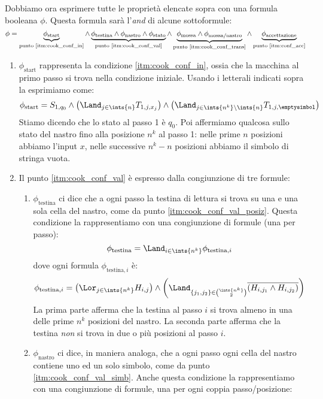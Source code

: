 Dobbiamo ora esprimere tutte le propriet\`a elencate sopra con una formula booleana $\phi$.
Questa formula sar\`a l'\emph{and} di alcune sottoformule:
\[
	\phi = 
	\underbrace{\phi_{\text{start}}}_{\text{punto \ref{itm:cook_conf_in}}} \land 
	\underbrace{\phi_{\text{testina}} \land \phi_{\text{nastro}} \land \phi_{\text{stato}}}_{\text{punto \ref{itm:cook_conf_val}}} \land 
	\underbrace{\phi_{\text{mossa}} \land \phi_{\text{mossa/nastro}}}_{\text{punto \ref{itm:cook_conf_trans}}} \land 
	\underbrace{\phi_{\text{accettazione}}}_{\text{punto \ref{itm:conf_acc}}}
\]
\begin{enumerate}
	\item $\phi_{\text{start}}$ rappresenta la condizione \ref{itm:cook_conf_in}, ossia che la macchina al primo passo si trova nella condizione iniziale.
	Usando i letterali indicati sopra la esprimiamo come:
	\[
		\phi_{\text{start}} = 
		S_{1,q_0} \land \left( \Land_{j \in \ints{n}} T_{1,j,x_j} \right) \land \left( \Land_{j \in \ints{n^k} \setminus \ints{n}} T_{1,j,\emptysimbol} \right)
	\]
	Stiamo dicendo che lo stato al passo 1 \`e $q_0$.
	Poi affermiamo qualcosa sullo stato del nastro fino alla posizione $n^k$ al passo 1: nelle prime $n$ posizioni abbiamo l'input $x$, nelle successive $n^k - n$ posizioni abbiamo il simbolo di stringa vuota.
	\item Il punto \ref{itm:cook_conf_val} \`e espresso dalla congiunzione di tre formule:
		\begin{enumerate}
			\item $\phi_{\text{testina}}$ ci dice che a ogni passo la testina di lettura si trova su una e una sola cella del nastro, come da punto \ref{itm:cook_conf_val_posiz}.
			Questa condizione la rappresentiamo con una congiunzione di formule (una per passo):
			\[
				\phi_{\text{testina}} = \Land_{i \in \ints{n^k}} \phi_{\text{testina},i}
			\]
			dove ogni formula $\phi_{\text{testina},i}$ \`e:
			\[
				\phi_{\text{testina},i} = \left( \Lor_{j \in \ints{n^k}} H_{i,j} \right) \land
				\left( \Land_{\{j_1,j_2\} \in \binom{\ints{n^k}}{2}} \overline{\left( H_{i,j_1} \land H_{i,j_2} \right)} \right)
			\]
			La prima parte afferma che la testina al passo $i$ si trova almeno in una delle prime $n^k$ posizioni del nastro.
			La seconda parte afferma che la testina \emph{non} si trova in due o pi\`u posizioni al passo $i$.
			\item $\phi_{\text{nastro}}$ ci dice, in maniera analoga, che a ogni passo ogni cella del nastro contiene uno ed un solo simbolo, come da punto \ref{itm:cook_conf_val_simb}.
			Anche questa condizione la rappresentiamo con una congiunzione di formule, una per ogni coppia passo/posizione:

\end{enumerate}
\end{enumerate}
